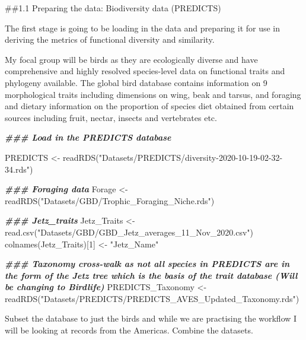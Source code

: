 \documentclass[
]{article}
\newenvironment{Shaded}{\begin{snugshade}}{\end{snugshade}}
\newcommand{\DecValTok}[1]{\textcolor[rgb]{0.00,0.00,0.81}{#1}}
\newcommand{\DocumentationTok}[1]{\textcolor[rgb]{0.56,0.35,0.01}{\textbf{\textit{#1}}}}
\newcommand{\FunctionTok}[1]{\textcolor[rgb]{0.00,0.00,0.00}{#1}}
\newcommand{\NormalTok}[1]{#1}
\newcommand{\OtherTok}[1]{\textcolor[rgb]{0.56,0.35,0.01}{#1}}
\newcommand{\StringTok}[1]{\textcolor[rgb]{0.31,0.60,0.02}{#1}}
\begin{document}
\#\#1.1 Preparing the data: Biodiversity data (PREDICTS)

The first stage is going to be loading in the data and preparing it for
use in deriving the metrics of functional diversity and similarity.

My focal group will be birds as they are ecologically diverse and have
comprehensive and highly resolved species-level data on functional
traits and phylogeny available. The global bird database contains
information on 9 morphological traits including dimensions on wing, beak
and tarsus, and foraging and dietary information on the proportion of
species diet obtained from certain sources including fruit, nectar,
insects and vertebrates etc.

\begin{Shaded}
\begin{Highlighting}[]
\DocumentationTok{\#\#\# Load in the PREDICTS database}

\NormalTok{PREDICTS }\OtherTok{\textless{}{-}} \FunctionTok{readRDS}\NormalTok{(}\StringTok{"Datasets/PREDICTS/diversity{-}2020{-}10{-}19{-}02{-}32{-}34.rds"}\NormalTok{)}

\DocumentationTok{\#\#\# Foraging data}
\NormalTok{Forage }\OtherTok{\textless{}{-}} \FunctionTok{readRDS}\NormalTok{(}\StringTok{"Datasets/GBD/Trophic\_Foraging\_Niche.rds"}\NormalTok{)}

\DocumentationTok{\#\#\# Jetz\_traits }
\NormalTok{Jetz\_Traits }\OtherTok{\textless{}{-}} \FunctionTok{read.csv}\NormalTok{(}\StringTok{"Datasets/GBD/GBD\_Jetz\_averages\_11\_Nov\_2020.csv"}\NormalTok{)}
\FunctionTok{colnames}\NormalTok{(Jetz\_Traits)[}\DecValTok{1}\NormalTok{] }\OtherTok{\textless{}{-}} \StringTok{"Jetz\_Name"} 

\DocumentationTok{\#\#\# Taxonomy cross{-}walk as not all species in PREDICTS are in the form of the Jetz tree which is the basis of the trait database (Will be changing to Birdlife)}
\NormalTok{PREDICTS\_Taxonomy }\OtherTok{\textless{}{-}} \FunctionTok{readRDS}\NormalTok{(}\StringTok{"Datasets/PREDICTS/PREDICTS\_AVES\_Updated\_Taxonomy.rds"}\NormalTok{)}
\end{Highlighting}
\end{Shaded}

Subset the database to just the birds and while we are practising the
workflow I will be looking at records from the Americas. Combine the
datasets.
\end{document}
